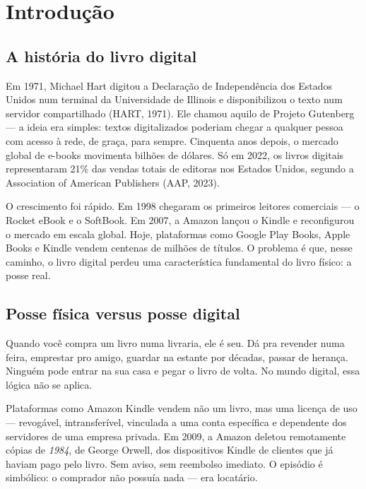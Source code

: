 \documentclass[12pt]{article}
\begin{document}
\section{Introdução}

\subsection*{A história do livro digital}

Em 1971, Michael Hart digitou a Declaração de Independência dos Estados Unidos num terminal da Universidade de Illinois e disponibilizou o texto num servidor compartilhado (HART, 1971). Ele chamou aquilo de Projeto Gutenberg — a ideia era simples: textos digitalizados poderiam chegar a qualquer pessoa com acesso à rede, de graça, para sempre. Cinquenta anos depois, o mercado global de e-books movimenta bilhões de dólares. Só em 2022, os livros digitais representaram 21\% das vendas totais de editoras nos Estados Unidos, segundo a Association of American Publishers (AAP, 2023).

O crescimento foi rápido. Em 1998 chegaram os primeiros leitores comerciais — o Rocket eBook e o SoftBook. Em 2007, a Amazon lançou o Kindle e reconfigurou o mercado em escala global. Hoje, plataformas como Google Play Books, Apple Books e Kindle vendem centenas de milhões de títulos. O problema é que, nesse caminho, o livro digital perdeu uma característica fundamental do livro físico: a posse real.

\subsection*{Posse física versus posse digital}

Quando você compra um livro numa livraria, ele é seu. Dá pra revender numa feira, emprestar pro amigo, guardar na estante por décadas, passar de herança. Ninguém pode entrar na sua casa e pegar o livro de volta. No mundo digital, essa lógica não se aplica.

Plataformas como Amazon Kindle vendem não um livro, mas uma licença de uso — revogável, intransferível, vinculada a uma conta específica e dependente dos servidores de uma empresa privada. Em 2009, a Amazon deletou remotamente cópias de \textit{1984}, de George Orwell, dos dispositivos Kindle de clientes que já haviam pago pelo livro. Sem aviso, sem reembolso imediato. O episódio é simbólico: o comprador não possuía nada — era locatário.
\end{document}
